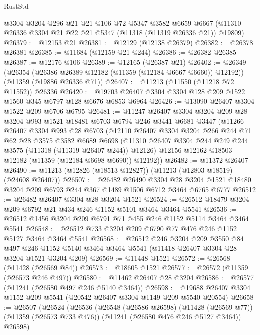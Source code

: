 \begin{lexlean}{RustStd}
\begin{coremodule}
{{{{{{{{{{{{{{{{{{{    @3304
    @3204
    @296
    @21
    @21
    @106
    @72
    @5347
    @3582
    @6659
    @6667
    (@11310 @26336 @3304 @21 @22 @21 @5347 (@11318 (@11319 @26336 @21)) @19809)
@26379 := @12153 @21
@26381 := @12129 (@12138 @26379)
@26382 := @26378 @26381
@26385 := @11684 (@12159 @21 @244)
@26386 := @26382 @26385
@26387 := @12176 @106
@26389 := @12165 (@26387 @21)
@26402 := @26349
    (@26354 (@26386 @26389 @12182 (@11359 (@12184 @6667 @6660)) @12192))
    (@11359 (@19886 @26336 @71))
@26407 := @11213 (@11550 (@11218 @72 @11552)) @26336
@26420 := @19703 @26407 @3304 @3304 @128 @209 @1522 @1560 @345 @6797 @128 @6676 @6853 @6964
@26426 := @13090 @26407 @3304 @1522 @209 @6706 @6795
@26481 := @11247
    @26407
    @3304
    @3204
    @209
    @28
    @3204
    @993
    @1521
    @18481
    @6703
    @6794
    @246
    @3441
    @6681
    @3447
    (@11266
      @26407
      @3304
      @993
      @28
      @6703
      (@12110
        @26407
        @3304
        @3204
        @266
        @244
        @71
        @62
        @28
        @3575
        @3582
        @6689
        @6698
        (@11310 @26407 @3304 @244 @249 @244 @3575 (@11318 (@11319 @26407 @244)) @12126)
        @12156
        @12162
        @18503
        @12182
        (@11359 (@12184 @6698 @6690))
        @12192))
@26482 := @11372 @26407
@26490 := @11213 (@12826 (@18513 @12827)) (@11213 (@12803 @18519) (@24608 @26407))
@26507 := @26482
    @26490
    @3304
    @28
    @3204
    @1521
    @18480
    @3204
    @209
    @6793
    @244
    @367
    @1489
    @1506
    @6712
    @3464
    @6765
    @6777
@26512 := @26482 @26407 @3304 @28 @3204 @1521
@26524 := @26512 @18479 @3204 @209 @6792 @21 @434 @246 @1152 @5101 @3464 @3464 @5541
@26536 := @26512 @1456 @3204 @209 @6791 @71 @455 @246 @1152 @5114 @3464 @3464 @5541
@26548 := @26512 @733 @3204 @209 @6790 @77 @476 @246 @1152 @5127 @3464 @3464 @5541
@26568 := @26512
    @246
    @3204
    @209
    @3550
    @84
    @497
    @246
    @1152
    @5140
    @3464
    @3464
    @5541
    (@11418 @26407 @3304 @28 @3204 @1521 @3204 @209)
@26569 := @11448 @1521
@26572 := @26568 (@11428 (@26569 @84))
@26573 := @18605 @1521
@26577 := @26572 (@11359 (@26573 @246 @497))
@26580 := @11462 @26407 @28 @3204
@26586 := @26577 (@11241 (@26580 @497 @246 @5140 @3464))
@26598 := @19688 @26407 @3304 @1152 @209 @5541 (@20542 @26407 @3304 @1149 @209 @5540 @20554)
@26658 := @26507
    (@26524
      (@26536
        (@26548
          (@26586 @26598)
          (@11428 (@26569 @77))
          (@11359 (@26573 @733 @476))
          (@11241 (@26580 @476 @246 @5127 @3464))
          @26598)
}}}}}}}}}}}}}}}}}}}
\end{coremodule}
\end{lexlean}
